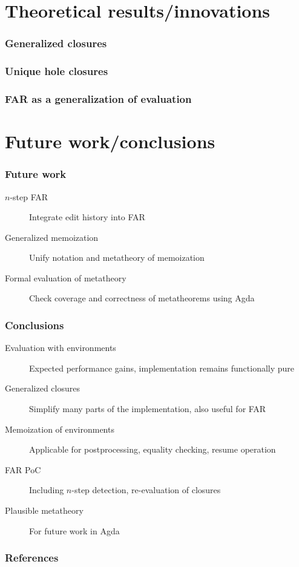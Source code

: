 \documentclass{beamer}
\begin{document}
\section{Theoretical results/innovations}

\begin{frame}
  \frametitle{Generalized closures}
\end{frame}

\begin{frame}
  \frametitle{Unique hole closures}
\end{frame}

\begin{frame}
  \frametitle{FAR as a generalization of evaluation}
\end{frame}

\section{Future work/conclusions}

\begin{frame}
  \frametitle{Future work}

  \begin{description}
  \item[$n$-step FAR] Integrate edit history into FAR
  \item[Generalized memoization] Unify notation and metatheory of memoization
  \item[Formal evaluation of metatheory] Check coverage and correctness of metatheorems using Agda
  \end{description}
\end{frame}


\begin{frame}
  \frametitle{Conclusions}

  \begin{description}
  \item[Evaluation with environments] Expected performance gains, implementation remains functionally pure
  \item[Generalized closures] Simplify many parts of the implementation, also useful for FAR
  \item[Memoization of environments] Applicable for postprocessing, equality checking, resume operation
  \item[FAR PoC] Including $n$-step detection, re-evaluation of closures
  \item[Plausible metatheory] For future work in Agda
  \end{description}
\end{frame}

\begin{frame}[allowframebreaks]
  \frametitle{References}

  \footnotesize
  
  
\end{frame}
\end{document}
